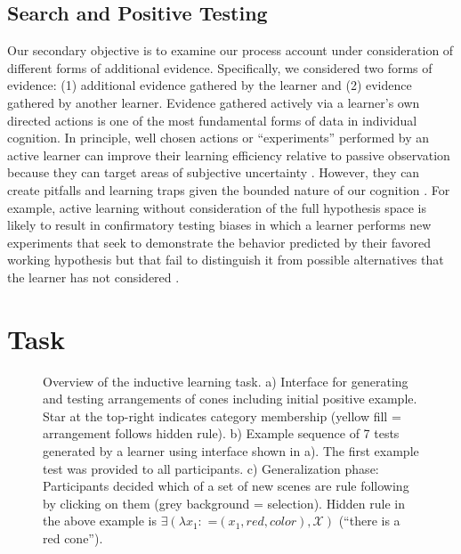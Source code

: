 \documentclass[doc,natbib,floatsintext]{apa7}
\newcommand{\xx}{\mathcal{X}} %
\begin{document}
\subsection{Search and Positive Testing}
Our secondary objective is to examine our process account under consideration of different forms of additional evidence. Specifically, we considered two forms of evidence: (1) additional evidence gathered by the learner and (2) evidence gathered by another learner. Evidence gathered actively via a learner's own directed actions \citep{settles2009active, gureckis2012self} is one of the most fundamental forms of data in individual cognition. In principle, well chosen actions or ``experiments'' performed by an active learner can improve their learning efficiency relative to passive observation because they can target areas of subjective uncertainty \citep{steyvers2003inferring, bramley2015conservative}. However, they can create pitfalls and learning traps given the bounded nature of our cognition \citep{rich2018limits}. For example, active learning without consideration of the full hypothesis space is likely to result in confirmatory testing biases in which a learner performs new experiments that seek to demonstrate the behavior predicted by their favored working hypothesis but that fail to distinguish it from possible alternatives that the learner has not considered \citep{klayman1987confirmation, wason1960failure}.

\section{Task}

\begin{figure}[!th]
    \centering
    \caption{Overview of the inductive learning task. a) Interface for generating and testing arrangements of cones including initial positive example. Star at the top-right indicates category membership (yellow fill = arrangement follows hidden rule). b) Example sequence of 7 tests generated by a learner using interface shown in a). The first example test was provided to all participants. c) Generalization phase: Participants decided which of a set of new scenes are rule following by clicking on them (grey background = selection). Hidden rule in the above example is $\exists(\lambda x_{1}: \text{ =}(x_1, red, color),\xx)$ (``there is a red cone'').}
    \label{fig:fig_1_zendo}
\end{figure}
\end{document}
